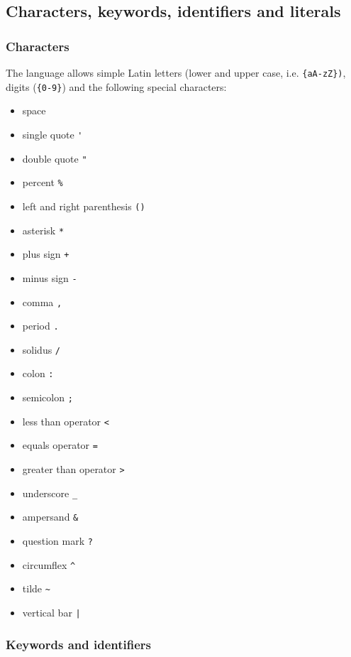 \documentclass[11pt,a4paper]{ivoa}
\begin{document}
\subsection{Characters, keywords, identifiers and literals}
\subsubsection{Characters}
\label{sec:characters}

The language allows simple Latin letters (lower and upper case, i.e.
\verb:{aA-zZ}):, digits (\verb:{0-9}:) and the following special characters:

\begin{itemize}
    \item space
    \item single quote \verb:':
    \item double quote \verb:":
    \item percent \verb:%:
    \item left and right parenthesis \verb:():
    \item asterisk \verb:*:
    \item plus sign \verb:+:
    \item minus sign \verb:-:
    \item comma \verb:,:
    \item period \verb:.:
    \item solidus \verb:/:
    \item colon \verb.:.
    \item semicolon \verb:;:
    \item less than operator \verb:<:
    \item equals operator \verb:=:
    \item greater than operator \verb:>:
    \item underscore \verb:_:
    \item ampersand \verb:&:
    \item question mark \verb:?:
    \item circumflex \verb:^:
    \item tilde \verb:~:
    \item vertical bar \verb:|:
\end{itemize}

\subsubsection{Keywords and identifiers}
\label{sec:keywords}
\end{document}
